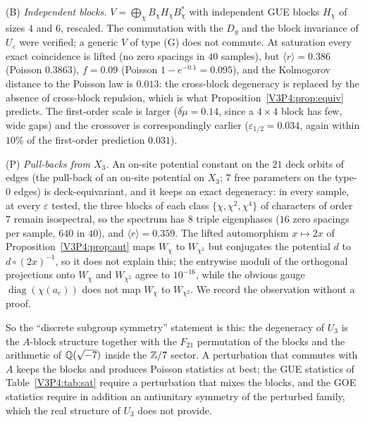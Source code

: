 \begin{remark}\label{V3P4:rem:equiv}
(B) \emph{Independent blocks.} $V=\bigoplus_\chi B_\chi H_\chi B_\chi^{*}$ with independent
GUE blocks $H_\chi$ of sizes $4$ and $6$, rescaled. The commutation with the $D_g$ and the block
invariance of $U_\varepsilon$ were verified; a generic $V$ of type (G) does not commute. At
saturation every exact coincidence is lifted (no zero spacings in $40$ samples), but
$\langle r\rangle=0.386$ (Poisson $0.3863$), $f=0.09$ (Poisson $1-e^{-0.1}=0.095$), and the
Kolmogorov distance to the Poisson law is $0.013$: the cross-block degeneracy is replaced by the
absence of cross-block repulsion, which is what Proposition~\ref{V3P4:prop:equiv} predicts.
The first-order scale is larger ($\overline{\delta\mu}=0.14$, since a $4\times4$ block has few,
wide gaps) and the crossover is correspondingly earlier ($\varepsilon_{1/2}=0.034$, again within
$10\%$ of the first-order prediction $0.031$).

(P) \emph{Pull-backs from $X_3$.} An on-site potential constant on the $21$ deck orbits of edges
(the pull-back of an on-site potential on $X_3$; $7$ free parameters on the type-$0$ edges) is
deck-equivariant, and it keeps an exact degeneracy: in every sample, at every $\varepsilon$ tested,
the three blocks of each class $\{\chi,\chi^{2},\chi^{4}\}$ of characters of order $7$ remain
isospectral, so the spectrum has $8$ triple eigenphases ($16$ zero spacings per sample, $640$ in
$40$), and $\langle r\rangle=0.359$. The lifted automorphism $x\mapsto2x$ of
Proposition~\ref{V3P4:prop:aut} maps $W_\chi$ to $W_{\chi^{2}}$ but conjugates the potential
$d$ to $d\circ(2x)^{-1}$, so it does not explain this; the entrywise moduli of the orthogonal
projections onto $W_\chi$ and $W_{\chi^{2}}$ agree to $10^{-16}$, while the obvious gauge
$\operatorname{diag}(\chi(a_e))$ does not map $W_\chi$ to $W_{\chi^{2}}$. We record the
observation without a proof.

So the ``discrete subgroup symmetry'' statement is this: the degeneracy of $U_3$ is the
$A$-block structure together with the $F_{21}$ permutation of the blocks and the arithmetic of
$\mathbb{Q}(\sqrt{-7})$ inside the $\mathbb{Z}/7$ sector. A perturbation that commutes with $A$ keeps the blocks
and produces Poisson statistics at best; the GUE statistics of Table~\ref{V3P4:tab:sat} require a
perturbation that mixes the blocks, and the GOE statistics require in addition an antiunitary
symmetry of the perturbed family, which the real structure of $U_3$ does not provide.
\end{remark}

